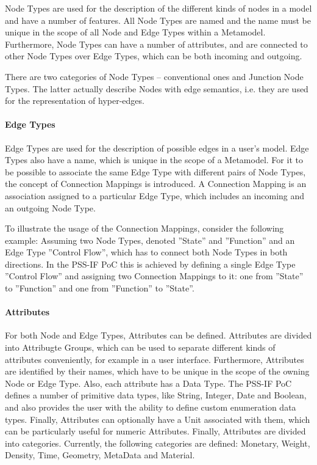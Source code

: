Node Types are used for the description of the different kinds of nodes in a model and have a number of features. All Node Types are named and the name must be unique in the scope of all Node and Edge Types within a Metamodel. Furthermore, Node Types can have a number of attributes, and are connected to other Node Types over Edge Types, which can be both incoming and outgoing.

There are two categories of Node Types -- conventional ones and Junction Node Types. The latter actually describe Nodes with edge semantics, i.e. they are used for the representation of hyper-edges.

\paragraph{Edge Types}

Edge Types are used for the description of possible edges in a user's model. Edge Types also have a name, which is unique in the scope of a Metamodel. For it to be possible to associate the same Edge Type with different pairs of Node Types, the concept of Connection Mappings is introduced. A Connection Mapping is an association assigned to a particular Edge Type, which includes an incoming and an outgoing Node Type.

To illustrate the usage of the Connection Mappings, consider the following example: Assuming two Node Types, denoted ''State'' and ''Function'' and an Edge Type ''Control Flow'', which has to connect both Node Types in both directions. In the PSS-IF PoC this is achieved by defining a single Edge Type ''Control Flow'' and assigning two Connection Mappings to it: one from ''State'' to ''Function'' and one from ''Function'' to ''State''.

\paragraph{Attributes}

For both Node and Edge Types, Attributes can be defined. Attributes are divided into Attribugte Groups, which can be used to separate different kinds of attributes conveniently, for example in a user interface. Furthermore, Attributes are identified by their names, which have to be unique in the scope of the owning Node or Edge Type. Also, each attribute has a Data Type. The PSS-IF PoC defines a number of primitive data types, like String, Integer, Date and Boolean, and also provides the user with the ability to define custom enumeration data types. Finally, Attributes can optionally have a Unit associated with them, which can be particularly useful for numeric Attributes. Finally, Attributes are divided into categories. Currently, the following categories are defined: Monetary, Weight, Density, Time, Geometry, MetaData and Material.

